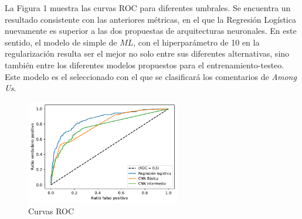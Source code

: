 \begin{table}[htbp]
	\centering
	\caption{Métricas para cada modelo}
	\label{tab:addlabel}%
\end{table}%

La Figura 1 muestra las curvas ROC para diferentes umbrales. Se encuentra un resultado consistente con las anteriores métricas, en el que la Regresión Logística nuevamente es superior a las dos propuestas de arquitecturas neuronales. En este sentido, el modelo de simple de $ML$, con el hiperparámetro de 10 en la regularización resulta ser el mejor no solo entre sus diferentes alternativas, sino también entre los diferentes modelos propuestos para el entrenamiento-testeo. Este modelo es el seleccionado con el que se clasificará los comentarios de \textit{Among Us}.

\begin{figure}[h!]
	\centering
	\includegraphics[width=0.6\textwidth]{../Figuras/roc.pdf}
	\caption{Curvas ROC}
\end{figure}

